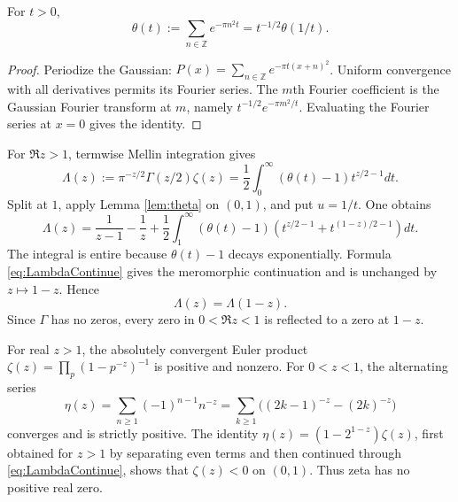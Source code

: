 \begin{lemma}\label{lem:theta}
For $t>0$,
\[
 \theta(t):=\sum_{n\in\mathbb Z}e^{-\pi n^2t}
 =t^{-1/2}\theta(1/t).
\]
\end{lemma}
\begin{proof}
Periodize the Gaussian: $P(x)=\sum_{n\in\mathbb Z}e^{-\pi t(x+n)^2}$.
Uniform convergence with all derivatives permits its Fourier series.  The
$m$th Fourier coefficient is the Gaussian Fourier transform at $m$, namely
$t^{-1/2}e^{-\pi m^2/t}$.  Evaluating the Fourier series at $x=0$ gives the
identity.
\end{proof}

For $\Re z>1$, termwise Mellin integration gives
\begin{equation}\label{eq:LambdaIntegral}
 \Lambda(z):=\pi^{-z/2}\Gamma(z/2)\zeta(z)
 =\frac12\int_0^\infty(\theta(t)-1)t^{z/2-1}dt.
\end{equation}
Split at $1$, apply Lemma \ref{lem:theta} on $(0,1)$, and put $u=1/t$.  One
obtains
\begin{equation}\label{eq:LambdaContinue}
\Lambda(z)=\frac1{z-1}-\frac1z+\frac12\int_1^\infty(\theta(t)-1)
 \left(t^{z/2-1}+t^{(1-z)/2-1}\right)dt.
\end{equation}
The integral is entire because $\theta(t)-1$ decays exponentially.  Formula
\eqref{eq:LambdaContinue} gives the meromorphic continuation and is unchanged
by $z\mapsto1-z$.  Hence
\begin{equation}\label{eq:functional}
 \Lambda(z)=\Lambda(1-z).
\end{equation}
Since $\Gamma$ has no zeros, every zero in $0<\Re z<1$ is reflected to a zero
at $1-z$.

For real $z>1$, the absolutely convergent Euler product
$\zeta(z)=\prod_p(1-p^{-z})^{-1}$ is positive and nonzero.  For
$0<z<1$, the alternating series
\[
 \eta(z)=\sum_{n\ge1}(-1)^{n-1}n^{-z}
 =\sum_{k\ge1}\bigl((2k-1)^{-z}-(2k)^{-z}\bigr)
\]
converges and is strictly positive.  The identity
$\eta(z)=(1-2^{1-z})\zeta(z)$, first obtained for $z>1$ by separating even
terms and then continued through \eqref{eq:LambdaContinue}, shows that
$\zeta(z)<0$ on $(0,1)$.  Thus zeta has no positive real zero.

